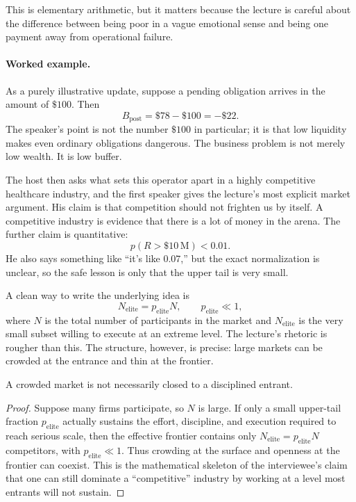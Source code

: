 This is elementary arithmetic, but it matters because the lecture is careful about the difference between being poor in a vague emotional sense and being one payment away from operational failure.

\paragraph{Worked example.}
As a purely illustrative update, suppose a pending obligation arrives in the amount of \(\text{\$}100\). Then
\begin{equation}
B_{\text{post}}=\text{\$}78-\text{\$}100=-\text{\$}22.
\end{equation}
The speaker's point is not the number \(\text{\$}100\) in particular; it is that low liquidity makes even ordinary obligations dangerous. The business problem is not merely low wealth. It is low buffer.

The host then asks what sets this operator apart in a highly competitive healthcare industry, and the first speaker gives the lecture's most explicit market argument. His claim is that competition should not frighten us by itself. A competitive industry is evidence that there is a lot of money in the arena. The further claim is quantitative:
\begin{equation}
p(R>\text{\$}10\,\mathrm{M}) < 0.01.
\end{equation}
He also says something like ``it's like \(0.07\),'' but the exact normalization is unclear, so the safe lesson is only that the upper tail is very small.

A clean way to write the underlying idea is
\begin{equation}
N_{\text{elite}} = p_{\text{elite}}N, \qquad p_{\text{elite}} \ll 1,
\end{equation}
where \(N\) is the total number of participants in the market and \(N_{\text{elite}}\) is the very small subset willing to execute at an extreme level. The lecture's rhetoric is rougher than this. The structure, however, is precise: large markets can be crowded at the entrance and thin at the frontier.

\begin{proposition}
A crowded market is not necessarily closed to a disciplined entrant.
\end{proposition}

\begin{proof}
Suppose many firms participate, so \(N\) is large. If only a small upper-tail fraction \(p_{\text{elite}}\) actually sustains the effort, discipline, and execution required to reach serious scale, then the effective frontier contains only \(N_{\text{elite}}=p_{\text{elite}}N\) competitors, with \(p_{\text{elite}}\ll 1\). Thus crowding at the surface and openness at the frontier can coexist. This is the mathematical skeleton of the interviewee's claim that one can still dominate a ``competitive'' industry by working at a level most entrants will not sustain.
\end{proof}

